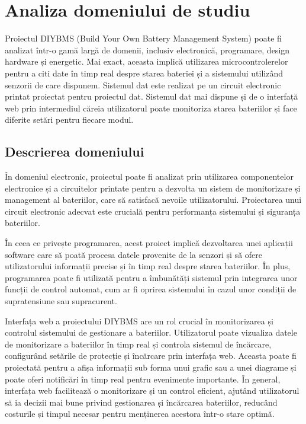 \clearpage
\section{Analiza domeniului de studiu}

Proiectul DIYBMS (Build Your Own Battery Management System) poate fi analizat într-o gamă largă de domenii, inclusiv electronică, programare, design hardware și energetic. Mai exact, aceasta implică utilizarea microcontrolerelor pentru a citi date în timp real despre starea bateriei și a sistemului utilizând senzorii de care dispunem. Sistemul dat este realizat pe un circuit electronic printat proiectat pentru proiectul dat. Sistemul dat mai dispune și de o interfață web prin intermediul căreia utilizatorul poate monitoriza starea bateriilor și face diferite setări pentru fiecare modul.

\subsection{Descrierea domeniului}
În domeniul electronic, proiectul poate fi analizat prin utilizarea componentelor electronice și a circuitelor printate pentru a dezvolta un sistem de monitorizare și management al bateriilor, care să satisfacă nevoile utilizatorului. Proiectarea unui circuit electronic adecvat este crucială pentru performanța sistemului și siguranța bateriilor.

În ceea ce privește programarea, acest proiect implică dezvoltarea unei aplicații software care să poată procesa datele provenite de la senzori și să ofere utilizatorului informații precise și în timp real despre starea bateriilor. În plus, programarea poate fi utilizată pentru a îmbunătăți sistemul prin integrarea unor funcții de control automat, cum ar fi oprirea sistemului în cazul unor condiții de supratensiune sau supracurent.

Interfața web a proiectului DIYBMS are un rol crucial în monitorizarea și controlul sistemului de gestionare a bateriilor. Utilizatorul poate vizualiza datele de monitorizare a bateriilor în timp real și controla sistemul de încărcare, configurând setările de protecție și încărcare prin interfața web. Aceasta poate fi proiectată pentru a afișa informații sub forma unui grafic sau a unei diagrame și poate oferi notificări în timp real pentru evenimente importante. În general, interfața web facilitează o monitorizare și un control eficient, ajutând utilizatorul să ia decizii mai bune privind gestionarea și încărcarea bateriilor, reducând costurile și timpul necesar pentru menținerea acestora într-o stare optimă. 

